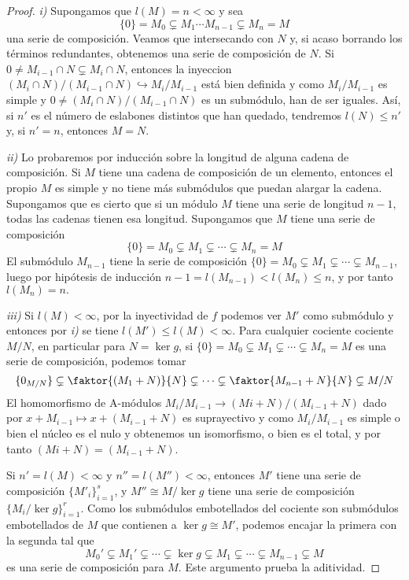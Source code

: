 \documentclass[../main.tex]{subfiles}
\begin{document}
\begin{proof}

\textit{i)} Supongamos que $l(M)=n<\infty$ y sea $$\{0\}=M_0\subsetneq M_1\cdots M_{n-1}\subsetneq M_n=M$$ una serie de composición. Veamos que intersecando con $N$ y, si acaso borrando los términos redundantes, obtenemos una serie de composición de $N$. Si $0 \neq M_{i-1}\cap N\subsetneq M_{i}\cap N$, entonces la inyeccion $(M_i\cap N)/(M_{i-1}\cap N)\hookrightarrow M_i/M_{i-1}$ está bien definida y como $M_i/M_{i-1}$ es simple y $0 \neq (M_i\cap N)/(M_{i-1}\cap N)$ es un submódulo, han de ser iguales. Así, si $n'$ es el número de eslabones distintos que han quedado, tendremos $l(N)\le n'$ y, si $n'=n$, entonces $M=N.$

\textit{ii)} Lo probaremos por inducción sobre la longitud de alguna cadena de composición. Si  $M$ tiene una cadena de composición de un elemento, entonces el propio $M$ es simple y no tiene más submódulos que puedan alargar la cadena. Supongamos que es cierto que si un módulo $M$ tiene una serie de longitud $n-1$, todas las cadenas tienen esa longitud. Supongamos que $M$ tiene una serie de composición
$$\{0\}=M_0\subsetneq M_1\subsetneq\cdots\subsetneq M_n=M$$
El submódulo $M_{n-1}$ tiene la serie de composición $\{0\}=M_0\subsetneq M_1\subsetneq\cdots\subsetneq M_{n-1}$, luego por hipótesis de inducción $n-1=l(M_{n-1})<l(M_n)\le n$, y por tanto $l(M_n)=n.$

\textit{iii)} Si $l(M)< \infty$, por la inyectividad de $f$ podemos ver $M'$ como submódulo y entonces por \textit{i)} se tiene $l(M') \leq l(M)< \infty$. Para cualquier cociente cociente $M/N$, en particular para $N = \ker g$, si $\{0\}=M_0\subsetneq M_1\subsetneq\cdots\subsetneq M_n=M$ es una serie de composición, podemos tomar
$$
\{0_{M/N}\}\subsetneq \faktor{(M_1+N)}{N}\subsetneq\cdots\subsetneq \faktor{M_{n-1}+N}{N} \subsetneq M/N
$$
El homomorfismo de A-módulos $M_i/M_{i-1} \to (Mi + N)/(M_{i-1} + N)$ dado por $x + M_{i-1} \mapsto x + (M_{i-1} + N)$ es suprayectivo y como $M_i/M_{i-1}$ es simple o bien el núcleo es el nulo y obtenemos un isomorfismo, o bien es el total, y por tanto $(Mi + N) = (M_{i-1} + N)$.

Si $n'=l(M)<\infty$ y $n''=l(M'')<\infty$, entonces $M'$ tiene una serie de composición $\{M'_i\}_{i=1}^s$, y $M''\cong M/\ker g$ tiene una serie de composición $\{M_i/ \ker g\}_{i=1}^r$. Como los submódulos embotellados del cociente son submódulos embotellados de $M$ que contienen a $\ker g \cong M'$, podemos encajar la primera con la segunda tal que
$$M_0'\subsetneq M_1'\subsetneq\cdots\subsetneq\ker g\subsetneq M_1\subsetneq\cdots\subsetneq M_{n-1}\subsetneq M$$
es una serie de composición para $M.$ Este argumento prueba la aditividad.


\end{proof}
\end{document}
